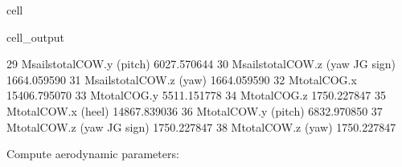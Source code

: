 \documentclass[letterpaper,10pt,english]{jupyterBook}
\begin{document}
\begin{sphinxuseclass}{cell}
\begin{sphinxVerbatimOutput}
\begin{sphinxuseclass}{cell_output}
\begin{sphinxVerbatim}[commandchars=\\\{\}]
29          M\PYGZus{}sails\PYGZus{}total\PYGZus{}COW.y (pitch)  \PYGZhy{}6027.570644
30  M\PYGZus{}sails\PYGZus{}total\PYGZus{}COW.z (yaw \PYGZhy{} JG sign)  \PYGZhy{}1664.059590
31            M\PYGZus{}sails\PYGZus{}total\PYGZus{}COW.z (yaw)   1664.059590
32                        M\PYGZus{}total\PYGZus{}COG.x \PYGZhy{}15406.795070
33                        M\PYGZus{}total\PYGZus{}COG.y  \PYGZhy{}5511.151778
34                        M\PYGZus{}total\PYGZus{}COG.z   1750.227847
35                 M\PYGZus{}total\PYGZus{}COW.x (heel) \PYGZhy{}14867.839036
36                M\PYGZus{}total\PYGZus{}COW.y (pitch)  \PYGZhy{}6832.970850
37        M\PYGZus{}total\PYGZus{}COW.z (yaw \PYGZhy{} JG sign)  \PYGZhy{}1750.227847
38                  M\PYGZus{}total\PYGZus{}COW.z (yaw)   1750.227847
\end{sphinxVerbatim}

\end{sphinxuseclass}\end{sphinxVerbatimOutput}

\end{sphinxuseclass}
\sphinxAtStartPar
Compute aerodynamic parameters:
\end{document}
